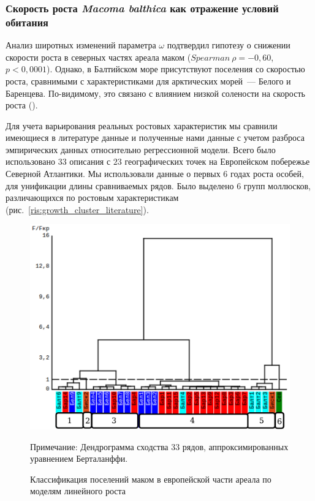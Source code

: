 {\subsubsection*{Скорость роста {\it Macoma balthica} как отражение условий обитания}
Анализ широтных изменений параметра $\omega$ подтвердил гипотезу о снижении скорости роста в северных частях ареала маком ($Spearman\ \rho = -0,60$, $p < 0,0001$).
Однако, в Балтийском море присутствуют поселения со скоростью роста, сравнимыми с характеристиками для арктических морей~--- Белого и Баренцева. 
По-видимому, это связано с влиянием низкой солености на скорость роста (\cite{Segerstrale_1960, Kube_et_al_1996}).

Для учета варьирования реальных ростовых характеристик мы сравнили имеющиеся в литературе данные и полученные нами данные с учетом разброса эмпирических данных относительно регрессионной модели.
Всего было использовано $33$ описания с $23$ географических точек на Европейском побережье Северной Атлантики.
Мы использовали данные о первых $6$ годах роста особей, для унификации длины сравниваемых рядов.
Было выделено $6$ групп моллюсков, различающихся по ростовым характеристикам (рис.~\ref{ris:growth_cluster_literature}).
	\begin{figure}[ht]
	\begin{center}	
		\includegraphics[height=0.4\textheight]{../Growth_sravnenie/Europe_clusters_usrednenie.pdf}
	\end{center}
		\caption{Классификация поселений маком в европейской части ареала по моделям линейного роста}
	\footnotesize{Примечание: Дендрограмма сходства 33 рядов, аппроксимированных уравнением Берталанффи. 
}
\end{figure}}
